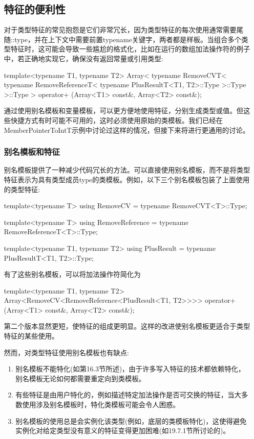 \subsection{特征的便利性}

对于类型特征的常见抱怨是它们非常冗长，因为类型特征的每次使用通常需要尾随::type，并在上下文中需要前置typename关键字，两者都是样板。当组合多个类型特征时，这可能会导致一些尴尬的格式化，比如在运行的数组加法操作符的例子中，若正确地实现它，确保没有返回常量或引用类型:

\begin{cpp}
template<typename T1, typename T2>
Array<
	typename RemoveCVT<
		typename RemoveReferenceT<
			typename PlusResultT<T1, T2>::Type
		>::Type
	>::Type
>
operator+ (Array<T1> const&, Array<T2> const&);
\end{cpp}

通过使用别名模板和变量模板，可以更方便地使用特征，分别生成类型或值。但这些快捷方式有时可能不可用的，这时必须使用原始的类模板。我们已经在MemberPointerToIntT示例中讨论过这样的情况，但接下来将进行更通用的讨论。

\subsubsection{别名模板和特征}

别名模板提供了一种减少代码冗长的方法。可以直接使用别名模板，而不是将类型特征表示为具有类型成员type的类模板。例如，以下三个别名模板包装了上面使用的类型特征:

\begin{cpp}
template<typename T>
using RemoveCV = typename RemoveCVT<T>::Type;

template<typename T>
using RemoveReference = typename RemoveReferenceT<T>::Type;

template<typename T1, typename T2>
using PlusResult = typename PlusResultT<T1, T2>::Type;
\end{cpp}

有了这些别名模板，可以将加法操作符简化为

\begin{cpp}
template<typename T1, typename T2>
Array<RemoveCV<RemoveReference<PlusResult<T1, T2>>>>
operator+ (Array<T1> const&, Array<T2> const&);
\end{cpp}

第二个版本显然更短，使特征的组成更明显。这样的改进使别名模板更适合于类型特征的某些使用。

然而，对类型特征使用别名模板也有缺点:

\begin{enumerate}
\item
别名模板不能特化(如第16.3节所述)，由于许多写入特征的技术都依赖特化，别名模板无论如何都需要重定向到类模板。

\item 
有些特征是由用户特化的，例如描述特定加法操作是否可交换的特征，当大多数使用涉及别名模板时，特化类模板可能会令人困惑。

\item
别名模板的使用总是会实例化该类型(例如，底层的类模板特化)，这使得避免实例化对给定类型没有意义的特征变得更加困难(如19.7.1节所讨论的)。
\end{enumerate}

